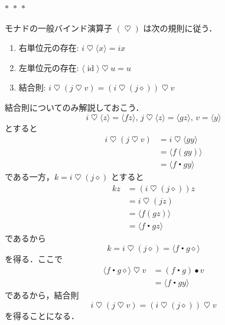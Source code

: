 \documentclass[a5paper,twoside,fleqn]{jsbook}
\newcommand{\separator}{\begin{center}$*$~$*$~$*$\end{center}}
\newcommand{\mAnonParam}{\diamond}
\DeclareMathOperator{\mId}{id}
\DeclareMathOperator{\mBind}{\heartsuit}
\DeclareMathOperator{\mComp}{\centerdot}
\DeclareMathOperator{\mMap}{\bullet}
\newcommand{\mPureWith}[1]{\langle#1\rangle}
\begin{document}
\separator

モナドの一般バインド演算子 $(\mBind)$ は次の規則に従う．
\begin{enumerate}
\item 右単位元の存在: $i\mBind{}\mPureWith{x}=ix$
\item 左単位元の存在: $\mPureWith{\mId}\mBind u=u$
\item 結合則: $i\mBind{}(j\mBind v)=(i\mBind{}(j\mAnonParam))\mBind v$
\end{enumerate}

結合則についてのみ解説しておこう．
\begin{equation}
i\mBind\mPureWith{z}=\mPureWith{fz},\,
j\mBind\mPureWith{z}=\mPureWith{gz},\,
v=\mPureWith{y}
\end{equation}
とすると
\begin{align}
i\mBind(j\mBind v)&=i\mBind\mPureWith{gy}\\
&=\mPureWith{f(gy)}\\
&=\mPureWith{f\mComp gy}
\end{align}
である一方，$k=i\mBind{}(j\mAnonParam)$ とすると
\begin{align}
kz&=(i\mBind(j\mAnonParam))z\\
&=i\mBind(jz)\\
&=\mPureWith{f(gz)}\\
&=\mPureWith{f\mComp gz}
\end{align}
であるから
\begin{equation}
k=i\mBind{}(j\mAnonParam)=\mPureWith{f\mComp g\mAnonParam}
\end{equation}
を得る．ここで
\begin{align}
\mPureWith{f\mComp g\mAnonParam}\mBind v
&=(f\mComp g)\mMap v\\
&=\mPureWith{f\mComp gy}
\end{align}
であるから，結合則
\begin{equation}
i\mBind{}(j\mBind v)=(i\mBind{}(j\mAnonParam))\mBind v
\end{equation}
を得ることになる．
\end{document}
